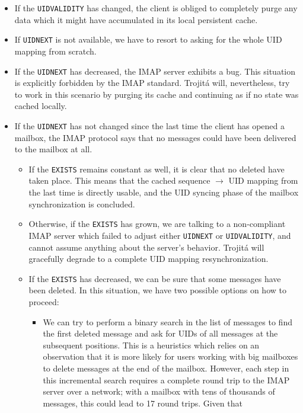 \documentclass[trojita]{subfiles}
\begin{document}
\begin{itemize}
  \item If the {\tt UIDVALIDITY} has changed, the client is obliged to completely purge any data which it might have
    accumulated in its local persistent cache.
  \item If {\tt UIDNEXT} is not available, we have to resort to asking for the whole UID mapping from scratch.
  \item If the {\tt UIDNEXT} has decreased, the IMAP server exhibits a bug.  This situation is explicitly forbidden by
    the IMAP standard.  Trojitá will, nevertheless, try to work in this scenario by purging its cache and continuing as
    if no state was cached locally.
  \item If the {\tt UIDNEXT} has not changed since the last time the client has opened a mailbox, the IMAP protocol says
    that no messages could have been delivered to the mailbox at all.
    \begin{itemize}
      \item If the {\tt EXISTS} remains constant as well, it is clear that no deleted have taken place. This means that
        the cached sequence $\rightarrow$ UID mapping from the last time is directly usable, and the UID syncing phase
        of the mailbox synchronization is concluded.
      \item Otherwise, if the {\tt EXISTS} has grown, we are talking to a non-compliant IMAP server which failed to
        adjust either {\tt UIDNEXT} or {\tt UIDVALIDITY}, and cannot assume anything about the server's behavior.
        Trojitá will gracefully degrade to a complete UID mapping resynchronization.
      \item If the {\tt EXISTS} has decreased, we can be sure that some messages have been deleted.  In this situation,
        we have two possible options on how to proceed:
        \begin{itemize}
          \item We can try to perform a binary search in the list of messages to find the first deleted message and ask
            for UIDs of all messages at the subsequent positions.  This is a heuristics which relies on an observation
            that it is more likely for users working with big mailboxes to delete messages at the end of the mailbox.
            However, each step in this incremental search requires a complete round trip to the IMAP server over a
            network; with a mailbox with tens of thousands of messages, this could lead to 17 round trips.  Given that

\end{itemize}
\end{itemize}
\end{itemize}
\end{document}
